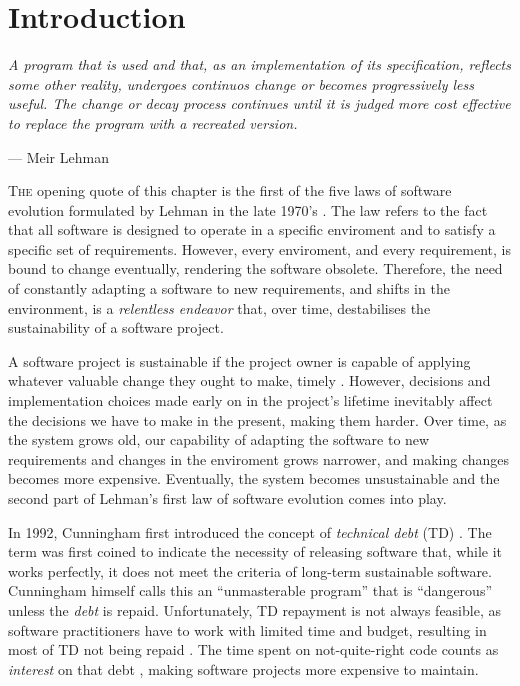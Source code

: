 \chapter{Introduction}\label{chap:introduction}

\epigraph{\emph{A program that is used and that, as an implementation of its specification, reflects some other reality, undergoes continuos change or becomes progressively less useful.
The change or decay process continues until it is judged more cost effective to replace the program with a recreated version.}}{--- Meir Lehman}

\lettrine{T}{he} opening quote of this chapter is the first of the five laws of software evolution formulated by Lehman in the late 1970's \cite{Lehman1979}.
The law refers to the fact that all software is designed to operate in a specific enviroment and to satisfy a specific set of requirements. 
However, every enviroment, and every requirement, is bound to change eventually, rendering the software obsolete. %
Therefore, the need of constantly adapting a software to new requirements, and shifts in the environment, is a \emph{relentless endeavor} that, over time, destabilises the sustainability of a software project.

A software project is sustainable if the project owner is capable of applying whatever valuable change they ought to make, timely \cite{Winters2020}.
However, decisions and implementation choices made early on in the project's lifetime inevitably affect the decisions we have to make in the present, making them harder.
Over time, as the system grows old, our capability of adapting the software to new requirements and changes in the enviroment grows narrower, and making changes becomes more expensive.
Eventually, the system becomes unsustainable and the second part of Lehman's first law of software evolution comes into play.

In 1992, Cunningham first introduced the concept of \emph{technical debt} (TD) \cite{Cunningham1992}. 
The term was first coined to indicate the necessity of releasing software that, while it works perfectly, it does not meet the criteria of long-term sustainable software. 
Cunningham himself calls this an ``unmasterable program'' that is ``dangerous'' unless the \emph{debt} is repaid.
Unfortunately, TD repayment is not always feasible, as software practitioners have to work with limited time and budget, resulting in most of TD not being repaid \cite{Digkas2018}.
The time spent on not-quite-right code counts as \emph{interest} on that debt \cite{Cunningham1992}, making software projects more expensive to maintain.


